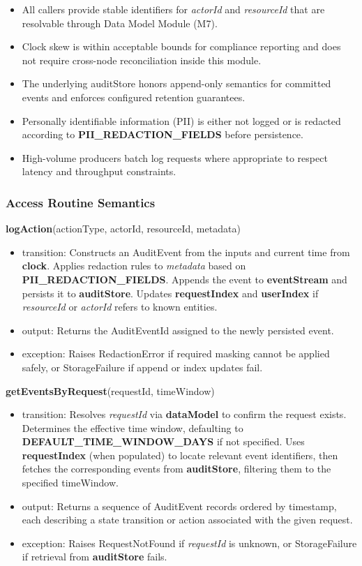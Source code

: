 \documentclass[12pt, titlepage]{article}
\begin{document}
\begin{itemize}
  \item All callers provide stable identifiers for \textit{actorId} and \textit{resourceId} that are resolvable through Data Model Module (M7).
  \item Clock skew is within acceptable bounds for compliance reporting and does not require cross-node reconciliation inside this module.
  \item The underlying auditStore honors append-only semantics for committed events and enforces configured retention guarantees.
  \item Personally identifiable information (PII) is either not logged or is redacted according to \textbf{PII\_REDACTION\_FIELDS} before persistence.
  \item High-volume producers batch log requests where appropriate to respect latency and throughput constraints.
\end{itemize}

\subsubsection{Access Routine Semantics}

\noindent\textbf{logAction}(actionType, actorId, resourceId, metadata)
\begin{itemize}
  \item transition: Constructs an AuditEvent from the inputs and current time from \textbf{clock}. Applies redaction rules to \textit{metadata} based on \textbf{PII\_REDACTION\_FIELDS}. Appends the event to \textbf{eventStream} and persists it to \textbf{auditStore}. Updates \textbf{requestIndex} and \textbf{userIndex} if \textit{resourceId} or \textit{actorId} refers to known entities.
  \item output: Returns the AuditEventId assigned to the newly persisted event.
  \item exception: Raises RedactionError if required masking cannot be applied safely, or StorageFailure if append or index updates fail.
\end{itemize}

\noindent\textbf{getEventsByRequest}(requestId, timeWindow)
\begin{itemize}
  \item transition: Resolves \textit{requestId} via \textbf{dataModel} to confirm the request exists. Determines the effective time window, defaulting to \textbf{DEFAULT\_TIME\_WINDOW\_DAYS} if not specified. Uses \textbf{requestIndex} (when populated) to locate relevant event identifiers, then fetches the corresponding events from \textbf{auditStore}, filtering them to the specified timeWindow.
  \item output: Returns a sequence of AuditEvent records ordered by timestamp, each describing a state transition or action associated with the given request.
  \item exception: Raises RequestNotFound if \textit{requestId} is unknown, or StorageFailure if retrieval from \textbf{auditStore} fails.
\end{itemize}
\end{document}
